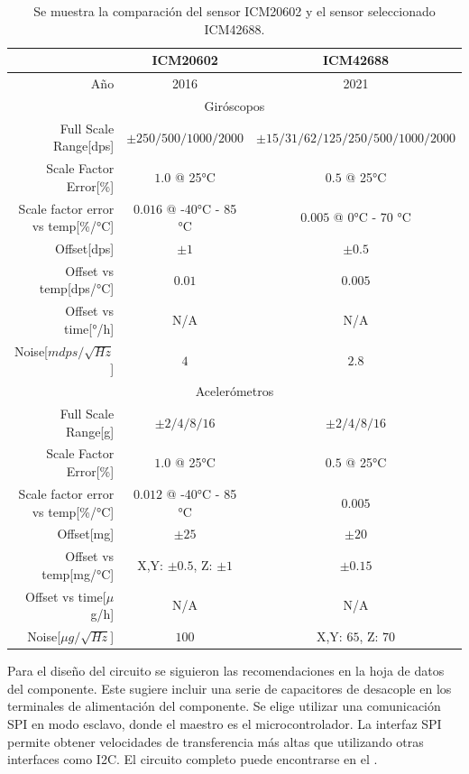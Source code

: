 \begin{table}[H]
    \centering
    \begin{tabular}{|r||c|c|}
        \hline
         & ICM20602 & ICM42688 \\
        \hline
        Año & 2016 & 2021\\
        \hline
        \multicolumn{3}{|c|}{Giróscopos}\\
        \hline
        Full Scale Range[dps] & $\pm 250/500/1000/2000$ & $\pm 15/31/62/125/250/500/1000/2000$\\
        Scale Factor Error[\%] & $1.0$ @ 25°C & $0.5$ @ 25°C\\
        Scale factor error vs temp[\%/°C] & $0.016$ @ -40°C - 85 °C & $0.005$ @ 0°C - 70 °C\\
        Offset[dps] & $\pm 1$ & $\pm 0.5$\\
        Offset vs temp[dps/°C] & $0.01$ & $0.005$\\
        Offset vs time[°/h] & N/A & N/A\\
        Noise[$mdps/\sqrt{Hz}$] & $4$ & $2.8$\\
        \hline
        \multicolumn{3}{|c|}{Acelerómetros}\\
        \hline
        Full Scale Range[g] & $\pm 2/4/8/16$ & $\pm 2/4/8/16 $\\
        Scale Factor Error[\%] & $1.0$ @ 25°C & $0.5$ @ 25°C\\
        Scale factor error vs temp[\%/°C] & $0.012$ @ -40°C - 85 °C & $0.005$\\
        Offset[mg] & $\pm 25$ & $\pm 20$\\
        Offset vs temp[mg/°C] & X,Y: $\pm 0.5$, Z: $\pm 1$ & $\pm 0.15$\\
        Offset vs time[$\mu$g/h] & N/A & N/A\\
        Noise[$\mu g/\sqrt{Hz}$] & $100$ & X,Y: $65$, Z: $70$\\        
        \hline       
    \end{tabular}
    \caption{Se muestra la comparación del sensor ICM20602 y el sensor seleccionado ICM42688.}
    \label{tab:comparacion_IMUs_TDK}
\end{table}

Para el diseño del circuito se siguieron las recomendaciones en la hoja de datos del componente. Este sugiere incluir una serie de capacitores de desacople en los terminales de alimentación del componente. Se elige utilizar una comunicación SPI en modo esclavo, donde el maestro es el microcontrolador. La interfaz SPI permite obtener velocidades de transferencia más altas que utilizando otras interfaces como I2C. El circuito completo puede encontrarse en el .\\

